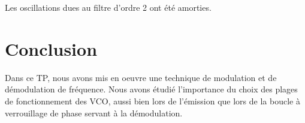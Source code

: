 \documentclass[../../Cours_M1.tex]{subfiles}
\begin{document}
Les oscillations dues au filtre d'ordre 2 ont été amorties.

\section*{Conclusion}

Dans ce TP, nous avons mis en oeuvre une technique de modulation et de démodulation de fréquence. Nous avons étudié l'importance du choix des plages de fonctionnement des VCO, aussi bien lors de l'émission que lors de la boucle à verrouillage de phase servant à la démodulation.
\end{document}
